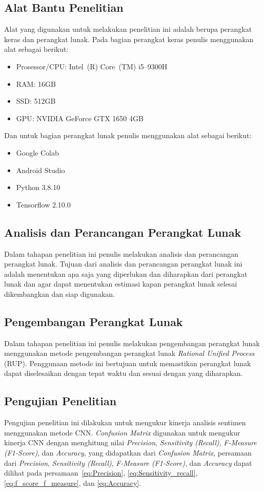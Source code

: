 \subsection{Alat Bantu Penelitian}
Alat yang digunakan untuk melakukan penelitian ini adalah berupa perangkat keras dan perangkat
lunak. Pada bagian perangkat keras penulis menggunakan alat sebagai berikut:

\begin{itemize}
  \item Prosessor/CPU\@: Intel~(R) Core~(TM) i5--9300H
  \item RAM\@: 16GB
  \item SSD\@: 512GB
  \item GPU\@: NVIDIA GeForce GTX 1650 4GB
\end{itemize}

Dan untuk bagian perangkat lunak penulis menggunakan alat sebagai berikut:

\begin{itemize}
  \item Google Colab
  \item Android Studio
  \item Python 3.8.10
  \item Tensorflow 2.10.0
\end{itemize}

\subsection{Analisis dan Perancangan Perangkat Lunak}
Dalam tahapan penelitian ini penulis melakukan analisis dan perancangan perangkat lunak.
Tujuan dari analisis dan perancangan perangkat lunak ini adalah menentukan apa saja yang
diperlukan dan diharapkan dari perangkat lunak dan agar dapat menentukan estimasi kapan perangkat lunak
selesai dikembangkan dan siap digunakan.

\subsection{Pengembangan Perangkat Lunak}
Dalam tahapan penelitian ini penulis melakukan pengembangan perangkat lunak menggunakan
metode pengembangan perangkat lunak \emph{Rational Unified Process} (RUP). Penggunaan metode ini bertujuan
untuk memastikan perangkat lunak dapat diselesaikan dengan tepat waktu dan sesuai dengan yang diharapkan.

\subsection{Pengujian Penelitian}
Pengujian penelitian ini dilakukan untuk mengukur kinerja analisis sentimen menggunakan metode
CNN\@. \emph{Confusion Matrix} digunakan untuk mengukur kinerja CNN dengan menghitung nilai
\emph{Precision}, \emph{Sensitivity (Recall)}, \emph{F-Measure (F1-Score)}, dan \emph{Accuracy},
yang didapatkan dari \emph{Confusion Matrix}, persamaan dari \emph{Precision}, \emph{Sensitivity (Recall)}, \emph{F-Measure (F1-Score)}, dan \emph{Accuracy}
dapat dilihat pada persamaan~\ref{eq:Precision}, \ref{eq:Sensitivity_recall}, \ref{eq:f_score_f_measure}, dan \ref{eq:Accuracy}.

